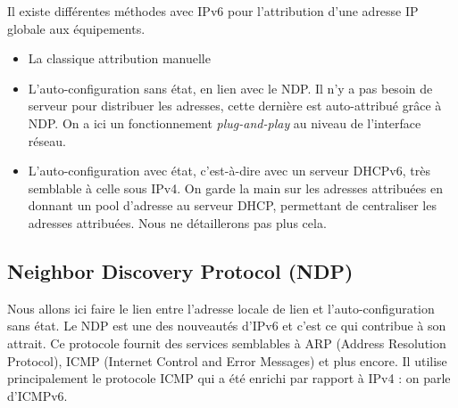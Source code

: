 Il existe différentes méthodes avec IPv6 pour l’attribution d’une adresse IP globale aux équipements.

\begin{itemize}
  \item La classique attribution manuelle
  \item L’auto-configuration sans état, en lien avec le NDP. Il n’y a pas besoin de serveur pour distribuer les adresses, cette dernière est auto-attribué grâce à NDP. On a ici un fonctionnement \emph{plug-and-play} au niveau de l’interface réseau.
  \item L’auto-configuration avec état, c’est-à-dire avec un serveur DHCPv6, très semblable à celle sous IPv4. On garde la main sur les adresses attribuées en donnant un pool d’adresse au serveur DHCP, permettant de centraliser les adresses attribuées. Nous ne détaillerons pas plus cela.
\end{itemize}

\subsection{Neighbor Discovery Protocol (NDP)}

Nous allons ici faire le lien entre l’adresse locale de lien et l’auto-configuration sans état.
Le NDP est une des nouveautés d’IPv6 et c’est ce qui contribue à son attrait.
Ce protocole fournit des services semblables à ARP (Address Resolution Protocol), ICMP (Internet Control and Error Messages) et plus encore.
Il utilise principalement le protocole ICMP qui a été enrichi par rapport à IPv4 : on parle d’ICMPv6.

